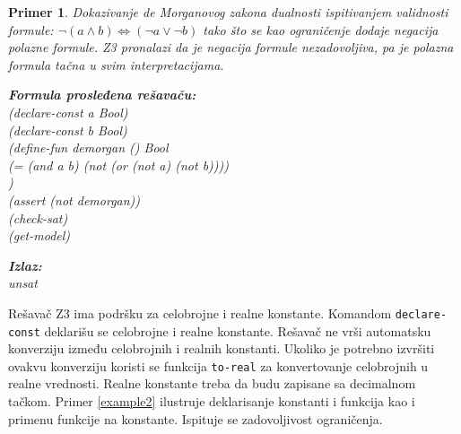 \documentclass[12pt,oneside]{memoir}
\newcommand\tab[1][0.5cm]{\hspace*{#1}}
\newtheorem{primer}{Primer}
\begin{document}
\begin{primer} \label{example1} Dokazivanje de Morganovog zakona dualnosti\label{primer:demorgan} ispitivanjem validnosti formule: $\neg{(a \land b)} \Leftrightarrow (\neg{a} \lor \neg{b}) $ tako što se kao ograničenje dodaje negacija polazne formule. Z3 pronalazi da je negacija formule nezadovoljiva, pa je polazna formula tačna u svim interpretacijama. \\

\hspace{-0.6cm}
\begin{minipage}[b]{0.5\textwidth}
\textbf{Formula prosleđena rešavaču:}
\\(declare-const a Bool)
\\(declare-const b Bool)
\\(define-fun demorgan () Bool
\\\tab (= (and a b) (not (or (not a) (not b))))
\\)
\\(assert (not demorgan))
\\(check-sat) 
\\(get-model)
\end{minipage}
\hspace{1.5cm}
\begin{minipage}[t]{0.4\textwidth}
\vspace{-5.35cm}
\textbf{Izlaz:}
\\unsat
\end{minipage}
\end{primer}

Rešavač Z3 ima podršku za celobrojne i realne konstante. Komandom \texttt{declare-const} deklarišu se celobrojne i realne konstante. Rešavač ne vrši automatsku konverziju između celobrojnih i realnih konstanti. Ukoliko je potrebno izvršiti ovakvu konverziju koristi se funkcija \texttt{to-real} za konvertovanje celobrojnih u realne vrednosti.
Realne konstante treba da budu zapisane sa decimalnom tačkom. Primer \ref{example2} ilustruje deklarisanje konstanti i funkcija kao i primenu funkcije na konstante. Ispituje se zadovoljivost ograničenja.
\end{document}
